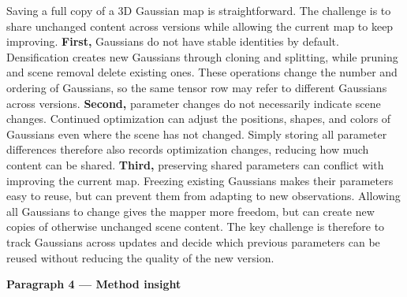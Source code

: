 Saving a full copy of a 3D Gaussian map is straightforward.
The challenge is to share unchanged content across versions while
allowing the current map to keep improving.
\textbf{First,} Gaussians do not have stable identities by default.
Densification creates new Gaussians through cloning and splitting,
while pruning and scene removal delete existing ones.
These operations change the number and ordering of Gaussians,
so the same tensor row may refer to different Gaussians across versions.
\textbf{Second,} parameter changes do not necessarily indicate scene changes.
Continued optimization can adjust the positions, shapes, and colors
of Gaussians even where the scene has not changed.
Simply storing all parameter differences therefore also records
optimization changes, reducing how much content can be shared.
\textbf{Third,} preserving shared parameters can conflict with improving
the current map.
Freezing existing Gaussians makes their parameters easy to reuse,
but can prevent them from adapting to new observations.
Allowing all Gaussians to change gives the mapper more freedom,
but can create new copies of otherwise unchanged scene content.
The key challenge is therefore to track Gaussians across updates
and decide which previous parameters can be reused without
reducing the quality of the new version.

\textbf{Paragraph 4 — Method insight}





